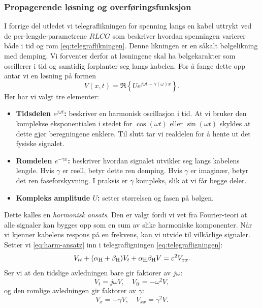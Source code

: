 \subsubsection{Propagerende løsning og overføringsfunksjon}

I forrige del utledet vi telegraflikningen for spenning langs en kabel uttrykt ved de per-lengde-parametrene $RLCG$ som beskriver hvordan spenningen varierer både i tid og rom \eqref{eq:telegraflikningen}. Denne likningen er en såkalt bølgelikning med demping. Vi forventer derfor at løsningene skal ha bølgekarakter som oscillerer i tid og samtidig forplanter seg langs kabelen. For å fange dette opp antar vi en løsning på formen \cite{HaytBuck2018}
\begin{equation}
V(x,t) = \Re\!\left\{ U e^{j\omega t - \gamma(\omega)x} \right\}.
\label{eq:harm-ansatz}
\end{equation}
Her har vi valgt tre elementer:
\begin{itemize}
    \item \textbf{Tidsdelen $e^{j\omega t}$:} beskriver en harmonisk oscillasjon i tid. At vi bruker den 
    komplekse eksponentialen i stedet for $\cos(\omega t)$ eller $\sin(\omega t)$ skyldes at dette 
    gjør beregningene enklere. Til slutt tar vi realdelen for å hente ut det fysiske signalet.\\
    \item \textbf{Romdelen $e^{-\gamma x}$:} beskriver hvordan signalet utvikler seg langs kabelens lengde. 
    Hvis $\gamma$ er reell, betyr dette ren demping. Hvis $\gamma$ er imaginær, betyr det ren faseforskyvning. 
    I praksis er $\gamma$ kompleks, slik at vi får begge deler.\\
    \item \textbf{Kompleks amplitude $U$:} setter størrelsen og fasen på bølgen.\\
\end{itemize}
Dette kalles en \emph{harmonisk ansats}. Den er valgt fordi vi vet fra Fourier-teori at alle signaler 
kan bygges opp som en sum av slike harmoniske komponenter. Når vi kjenner kabelens respons på en frekvens, 
kan vi utvide til vilkårlige signaler. Setter vi \eqref{eq:harm-ansatz} inn i telegrafligningen \eqref{eq:telegrafligningen}:
\[    
    V_{tt} + (\alpha_{\mathrm{H}} + \beta_{\mathrm{H}})V_{t} + \alpha_{\mathrm{H}} \beta_{\mathrm{H}} V = c^2 V_{xx}.
\]
Ser vi at den tidslige avledningen bare gir faktorer av $j\omega$:
\[
    V_{t} = j\omega V, \quad V_{tt} = -\omega^2 V,
\]
og den romlige avledningen gir faktorer av $\gamma$:
\[
    V_{x} = -\gamma V, \quad V_{xx} = \gamma^2 V.
\]
